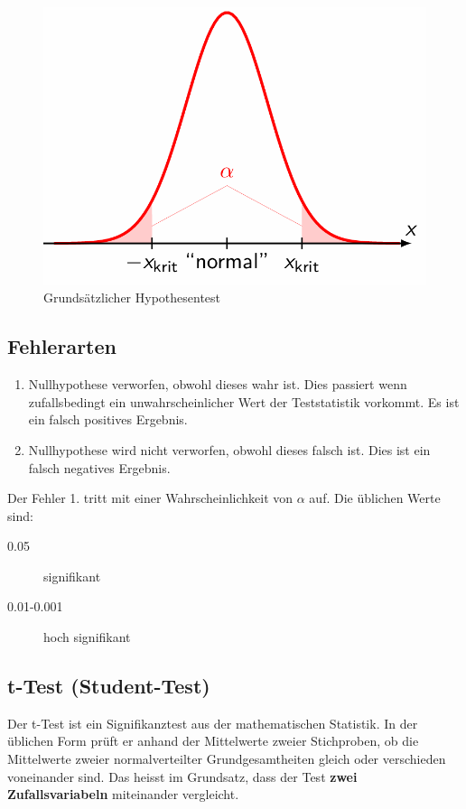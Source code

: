 \documentclass[../Main.tex]{subfiles}
\begin{document}
\begin{figure}[H]
    \centering
    \includegraphics[width=0.5\linewidth]{Images/hypo-test.png}
    \caption{Grundsätzlicher Hypothesentest}
\end{figure}

\subsection{Fehlerarten}
\begin{enumerate}
    \item Nullhypothese verworfen, obwohl dieses wahr ist. Dies passiert wenn zufallsbedingt ein unwahrscheinlicher Wert
    der Teststatistik vorkommt. Es ist ein falsch positives Ergebnis.
    \item Nullhypothese wird nicht verworfen, obwohl dieses falsch ist. Dies ist ein falsch negatives Ergebnis.
\end{enumerate}
Der Fehler 1. tritt mit einer Wahrscheinlichkeit von \(\alpha\) auf.
Die üblichen Werte sind:
\begin{description}
    \item[0.05] signifikant
    \item[0.01-0.001] hoch signifikant 
\end{description}

\subsection{t-Test (Student-Test)}
Der t-Test ist ein Signifikanztest aus der mathematischen Statistik.
In der üblichen Form prüft er anhand der Mittelwerte zweier Stichproben, 
ob die Mittelwerte zweier normalverteilter Grundgesamtheiten gleich oder verschieden voneinander sind.
Das heisst im Grundsatz, dass der Test \textbf{zwei Zufallsvariabeln} miteinander vergleicht.

\end{document}
